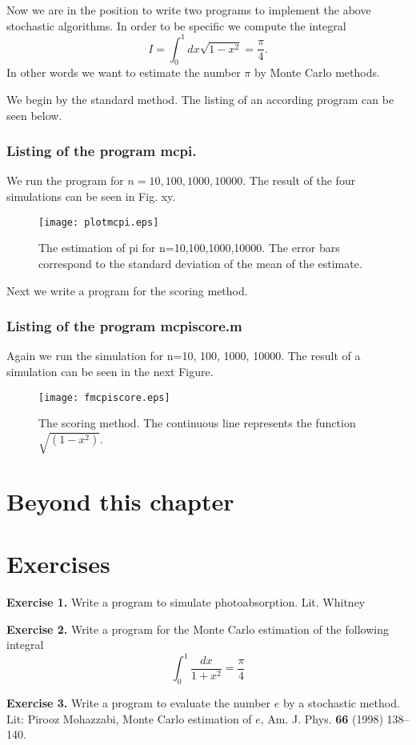 Now we are in the position to write two programs to implement the above
stochastic algorithms. In order to be specific we compute the integral
\begin{equation}
I = \int_0^1 dx \sqrt{1-x^2} = \frac{\pi}{4}.
\end{equation}
In other words we want to estimate the number $\pi$ by Monte Carlo
methods.

We begin by the standard method. The listing of an according 
program can be seen below.

\subsubsection{Listing of the program mcpi.}

We run the program for $n=10, 100, 1000, 10000$. The result of the 
four simulations can be seen in Fig. xy.
\begin{figure}
\texttt{[image: plotmcpi.eps]}
\caption{The estimation of pi for n=10,100,1000,10000. The 
error bars correspond to the standard deviation of the mean of the 
estimate.}
\end{figure}

Next we write a program for the scoring  method. 

\subsubsection{Listing of the program mcpiscore.m}

Again we run the simulation for n=10, 100, 1000, 10000.
The result of a simulation can be seen in the next Figure.
\begin{figure}
\texttt{[image: fmcpiscore.eps]}
\caption{The scoring method. The continuous line represents
the function $\sqrt{(1-x^2)}$.}
\end{figure}


\section{Beyond this chapter}


\section{Exercises}
{\bf Exercise 1.} Write a program to simulate photoabsorption.
    Lit. Whitney

{\bf Exercise 2.} Write a program for the Monte Carlo estimation of
the following integral
\begin{equation}
\int_0^1\frac{dx}{1+x^2} = \frac{\pi}{4}
\end{equation}

{\bf Exercise 3.} Write a program to evaluate the number $e$ by a
stochastic method.
Lit: Pirooz Mohazzabi, Monte Carlo estimation of $e$,
Am. J. Phys. {\bf 66} (1998) 138--140.
